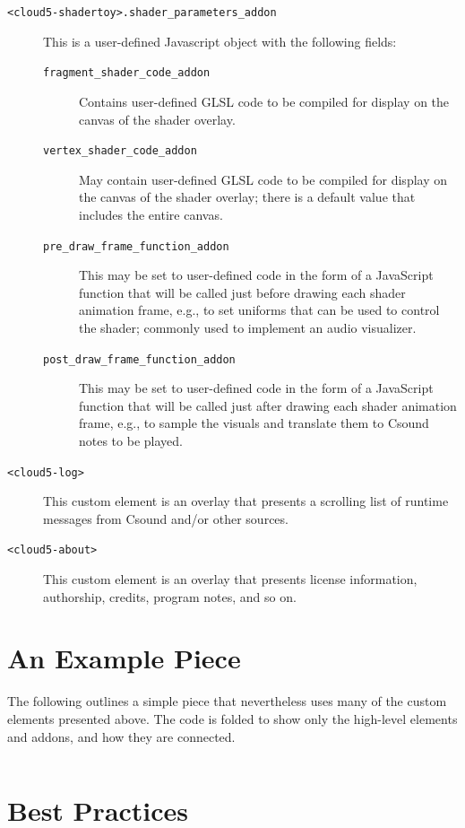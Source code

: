\documentclass[runningheads,a4paper]{llncs}
\begin{document}
\begin{description}
\item[\texttt{<cloud5-shadertoy>.shader\_parameters\_addon}] This is a user-defined Javascript object with the following fields:
\begin{description}
\item[\texttt{fragment\_shader\_code\_addon}] Contains user-defined GLSL code to be compiled for display on the canvas of the shader overlay.
\item[\texttt{vertex\_shader\_code\_addon}] May contain user-defined GLSL code to be compiled for display on the canvas of the shader overlay; there is a default value that includes the entire canvas.
\item[\texttt{pre\_draw\_frame\_function\_addon}] This may be set to user-defined code in the form of a JavaScript function that will be called just before drawing each shader animation frame, e.g., to set uniforms that can be used to control the shader; commonly used to implement an audio visualizer.
\item[\texttt{post\_draw\_frame\_function\_addon}] This may be set to user-defined code in the form of a JavaScript function that will be called just after drawing each shader animation frame, e.g., to sample the visuals and translate them to Csound notes to be played.
\end{description}
\item[\texttt{<cloud5-log>}] This custom element is an overlay that presents a scrolling list of runtime messages from Csound and/or other sources.
\item[\texttt{<cloud5-about>}] This custom element is an overlay that presents license information, authorship, credits, program notes, and so on.
\end{description}

\section{An Example Piece}

The following outlines a simple piece that nevertheless uses many of the custom elements presented above. The code is folded to show only the high-level elements and addons, and how they are connected.

\begin{verbatim}
\end{verbatim}

\section{Best Practices}
\end{document}
